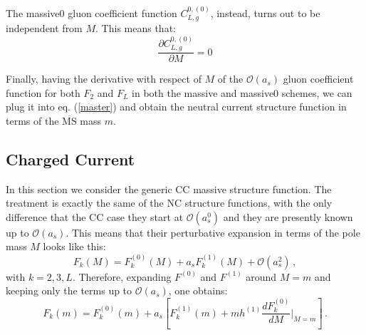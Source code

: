 \documentclass[10pt,a4paper]{article}
\begin{document}
The massive0 gluon coefficient function $C_{L,g}^{0,(0)}$, instead, turns out to be independent from $M$. This means that:
\begin{equation}
\frac{\partial C_{L,g}^{0,(0)}}{\partial M}= 0
\end{equation}

Finally, having the derivative with respect of $M$ of the $\mathcal{O}(a_s)$ gluon coefficient function for both $F_2$ and $F_L$ in both the massive and massive0 schemes, we can plug it into eq. (\ref{master}) and obtain the neutral current structure function in terms of the $\overline{\mbox{MS}}$ mass $m$.

\subsection{Charged Current}

In this section we consider the generic CC massive structure function. The treatment is exactly the same of the NC structure functions, with the only difference that the CC case they start at $\mathcal{O}(a_s^0)$ and they are presently known up to $\mathcal{O}(a_s)$. This means that their perturbative expansion in terms of the pole mass $M$ looks like this:
\begin{equation}
F_k(M) = F_k^{(0)}(M) + a_sF_k^{(1)}(M) + \mathcal{O}(a_s^2)\,,
\end{equation}
with $k=2,3,L$. Therefore, expanding $F^{(0)}$ and $F^{(1)}$ around $M=m$ and keeping only the terms up to $\mathcal{O}(a_s)$, one obtains:
\begin{equation}
F_k(m) = F_k^{(0)}(m) +
a_s\left[F_k^{(1)}(m)+mh^{(1)}\frac{dF_k^{(0)}}{dM}\bigg|_{M=m}\right]\,.
\label{gigi}
\end{equation}
\end{document}
